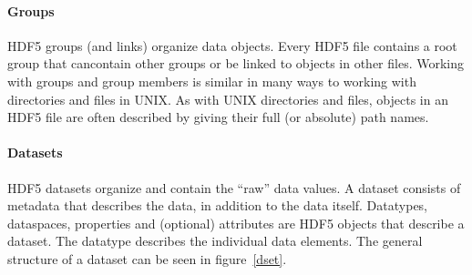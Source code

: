\paragraph{Groups}
HDF5 groups (and links) organize data objects. Every HDF5 file contains a root group that cancontain other groups or be linked to objects in other files. Working with groups and group members is similar in many ways to working with directories and files in UNIX. As with UNIX directories and files, objects in an HDF5 file are often described by giving their full (or absolute) path names.

\paragraph{Datasets}
HDF5 datasets organize and contain the “raw” data values. A dataset consists of metadata that describes the data, in addition to the data itself. Datatypes, dataspaces, properties and (optional) attributes are HDF5 objects that describe a dataset. The datatype describes the individual data elements. The general structure of a dataset can be seen in figure~\ref{dset}.












